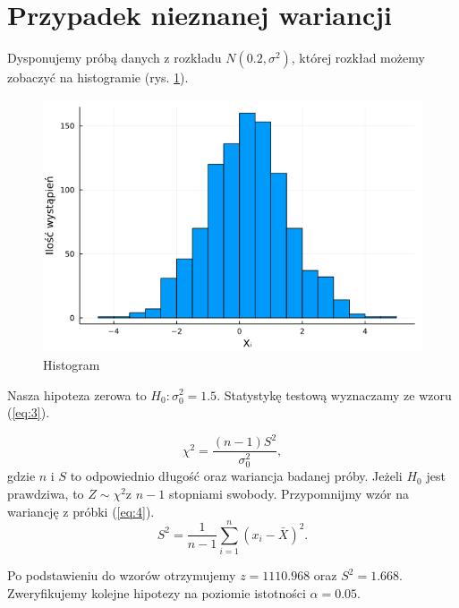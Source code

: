 \documentclass{article}
\theoremstyle{break}
\begin{document}
\section{Przypadek nieznanej wariancji}
Dysponujemy próbą danych z rozkładu $N(0.2,\sigma^2)$, której rozkład możemy zobaczyć na histogramie (rys. \ref{fig:hist2}).
\begin{figure}[H]
	\begin{center}
		\includegraphics[scale=0.5]{hist2.png}
		\caption{Histogram}
		\label{fig:hist2}
	\end{center}
\end{figure}
Nasza hipoteza zerowa to $H_0: \sigma^2_0 = 1.5$.  Statystykę testową wyznaczamy ze wzoru (\ref{eq:3}).

\begin{subequations} 
\begin{equation}\label{eq:3}
\chi^2 = \frac{(n-1)S^2}{\sigma^2_0},
\end{equation}
\end{subequations}
gdzie $n$ i $S$ to odpowiednio długość oraz wariancja badanej próby.
Jeżeli $H_0$ jest prawdziwa, to $Z\sim \chi^2$z $n-1$ stopniami swobody. Przypomnijmy wzór na wariancję z próbki (\ref{eq:4}).
\begin{subequations} \label{eq:4}
\begin{equation}
S^2=\frac{1}{n-1}\sum\limits_{i=1}^{n}(x_i-\bar{X})^2.
\end{equation}
\end{subequations}

Po podstawieniu do wzorów otrzymujemy $z = 1110.968$ oraz $S^2 =  1.668$. Zweryfikujemy kolejne hipotezy na poziomie istotności $\alpha = 0.05$.
\end{document}
